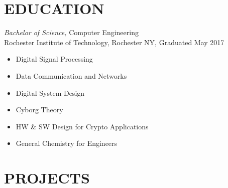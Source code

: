 \documentclass[line,mmmargin]{res}
\begin{document}
\begin{resume}
\section{EDUCATION} {\sl Bachelor of Science,} Computer Engineering \\ %
                Rochester Institute of Technology, Rochester NY, 
				Graduated May 2017 %
				\begin{multicols}{2}
					\begin{itemize}
						\itemsep -2pt
						\item[] Digital Signal Processing
						\item[] Data Communication and Networks
						\item[] Digital System Design
						\item[] Cyborg Theory
						\item[] HW \& SW Design for Crypto Applications
						\item[] General Chemistry for Engineers


						
					\end{itemize}
				\end{multicols}
 

\section{PROJECTS}
			

\end{resume}
\end{document}
